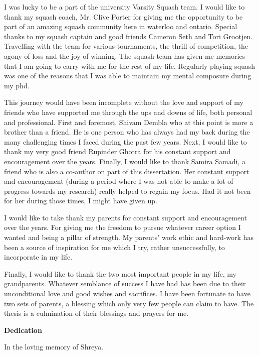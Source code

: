 \documentclass[letterpaper,12pt,titlepage,oneside,final]{book}
\let\origdoublepage\cleardoublepage
\newcommand{\clearemptydoublepage}{%
  \clearpage{\pagestyle{empty}\origdoublepage}}
\let\cleardoublepage\clearemptydoublepage
\begin{document}
I was lucky to be a part of the university Varsity Squash team. I would like to thank my squash coach, Mr. Clive Porter for giving me the opportunity to be part of an amazing squash community here in waterloo and ontario. Special thanks to my squash captain and good friends Cameron Seth and Tori Grootjen. Travelling with the team for various tournaments, the thrill of competition, the agony of loss and the joy of winning. The squash team has given me memories that I am going to carry with me for the rest of my life. Regularly playing squash was one of the reasons that I was able to maintain my mental composure during my phd. 

This journey would have been incomplete without the love and support of my friends who have supported me through the ups and downs of life, both personal and professional. First and foremost, Shivam Dembla who at this point is more a brother than a friend. He is one person who has always had my back during the many challenging times I faced during the past few years. Next, I would like to thank my very good friend Rupinder Ghotra for his constant support and encouragement over the years. Finally, I would like to thank Samira Samadi, a friend who is also a co-author on part of this dissertation. Her constant support and encouragement (during a period where I was not able to make a lot of progress towards my research) really helped to regain my focus. Had it not been for her  during those times, I might have given up.   

I would like to take thank my parents for constant support and encouragement over the years. For giving me the freedom to pursue whatever career option I wanted and being a pillar of strength. My parents' work ethic and hard-work has been a source of inspiration for me which I try, rather unsuccessfully, to incorporate in my life.  

Finally, I would like to thank the two most important people in my life, my grandparents. Whatever semblance of success I have had has been due to their unconditional love and good wishes and sacrifices. I have been fortunate to have two sets of parents, a blessing which only very few people can claim to have. The thesis is a culmination of their blessings and prayers for me. 

\cleardoublepage

\begin{center}\textbf{Dedication}\end{center}

\begin{center}{In the loving memory of Shreya.}\end{center}
\cleardoublepage
\end{document}
